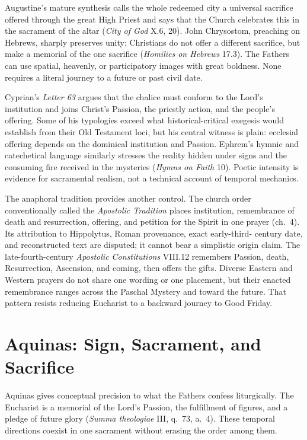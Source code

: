 \begin{deepstudy}
Augustine's mature synthesis calls the whole redeemed city a universal
sacrifice offered through the great High Priest and says that the Church
celebrates this in the sacrament of the altar (\emph{City of God} X.6, 20).
John Chrysostom, preaching on Hebrews, sharply preserves unity: Christians do
not offer a different sacrifice, but make a memorial of the one sacrifice
(\emph{Homilies on Hebrews} 17.3). The Fathers can use spatial, heavenly, or
participatory images with great boldness. None requires a literal journey to a
future or past civil date.

Cyprian's \emph{Letter 63} argues that the chalice must conform to the Lord's
institution and joins Christ's Passion, the priestly action, and the people's
offering. Some of his typologies exceed what historical-critical exegesis
would establish from their Old Testament loci, but his central witness is
plain: ecclesial offering depends on the dominical institution and Passion.
Ephrem's hymnic and catechetical language similarly stresses the reality hidden
under signs and the consuming fire received in the mysteries
(\emph{Hymns on Faith} 10). Poetic intensity is evidence for sacramental
realism, not a technical account of temporal mechanics.

The anaphoral tradition provides another control. The church order conventionally
called the \emph{Apostolic Tradition} places institution, remembrance of death
and resurrection, offering, and petition for the Spirit in one prayer
(ch.~4). Its attribution to Hippolytus, Roman provenance, exact early-third-
century date, and reconstructed text are disputed; it cannot bear a simplistic
origin claim. The late-fourth-century \emph{Apostolic Constitutions} VIII.12
remembers Passion, death, Resurrection, Ascension, and coming, then offers the
gifts. Diverse Eastern and Western prayers do not share one wording or one
placement, but their enacted remembrance ranges across the Paschal Mystery
and toward the future. That pattern resists reducing Eucharist to a backward
journey to Good Friday.

\section{Aquinas: Sign, Sacrament, and Sacrifice}

Aquinas gives conceptual precision to what the Fathers confess liturgically.
The Eucharist is a memorial of the Lord's Passion, the fulfillment of figures,
and a pledge of future glory (\emph{Summa theologiae} III, q.~73, a.~4).
These temporal directions coexist in one sacrament without erasing the order
among them.


\end{deepstudy}
